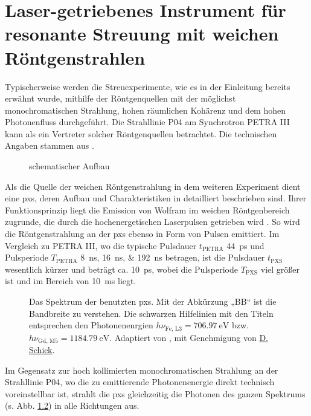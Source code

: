 \chapter{Laser-getriebenes Instrument für resonante Streuung mit weichen Röntgenstrahlen}
\label{text:quelle_roentgen}
Typischerweise werden die Streuexperimente, wie es in der Einleitung bereits erwähnt wurde, mithilfe der Röntgenquellen mit der möglichst monochromatischen Strahlung, hohen räumlichen Kohärenz und dem hohen Photonenfluss durchgeführt. Die Strahllinie P04 am Synchrotron PETRA III kann als ein Vertreter solcher Röntgenquellen betrachtet. Die technischen Angaben stammen aus \cite{viefhaus_variable_2013}.
\begin{figure}[H]
    \centering
    
    \caption{schematischer Aufbau}
    \label{fig:pxs_aufbau}
\end{figure}
\noindent
Als die Quelle der weichen Röntgenstrahlung in dem weiteren Experiment dient eine \gls{pxs}, deren Aufbau und Charakteristiken in \cite{schick_laser-driven_2021} detailliert beschrieben sind. Ihrer Funktionsprinzip liegt die Emission von Wolfram im weichen Röntgenbereich zugrunde, die durch die hochenergetischen Laserpulsen getrieben wird \cite{mantouvalou_high_2015}. So wird die Röntgenstrahlung an der \gls{pxs} ebenso in Form von Pulsen emittiert. Im Vergleich zu PETRA III, wo die typische Pulsdauer $t_\text{PETRA}$ \SI{44}{\pico\second} und Pulsperiode $T_\text{PETRA}$ \qtylist{8;16;192}{\nano\second}  betragen, ist die Pulsdauer $t_\text{PXS}$ wesentlich kürzer und beträgt ca. \SI{10}{\pico\second}, wobei die Pulsperiode $T_\text{PXS}$ viel größer ist und im Bereich von \SI{10}{\milli\second} liegt.
\begin{figure}[H]
    \centering
    
    \caption{Das Spektrum der benutzten \gls{pxs}. Mit der Abkürzung „BB“ ist die Bandbreite zu verstehen. Die schwarzen Hilfelinien mit den Titeln entsprechen den Photonenenrgien $h\nu_{\text{Fe, L3}} = \SI{706.97}{\eV}$ bzw. $h\nu_{\text{Gd, M5}} = \SI{1184,79}{\eV}$. Adaptiert von \cite{schick_laser-driven_2021}, mit Genehmigung von \href{https://orcid.org/0000-0001-7988-6489}{D. Schick}.}
    \label{fig:pxs_spectrum}
\end{figure}
\noindent
Im Gegensatz zur hoch kollimierten monochromatischen Strahlung an der Strahllinie P04, wo die zu emittierende Photonenenergie direkt technisch voreinstellbar ist, strahlt die \gls{pxs} gleichzeitig die Photonen des ganzen Spektrums (s. Abb. \ref{fig:pxs_spectrum}) in alle Richtungen aus.

